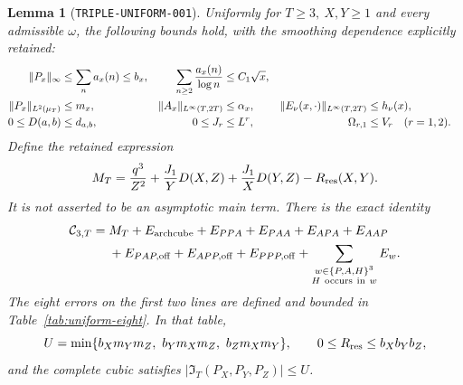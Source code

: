 \documentclass[11pt]{article}
\newtheorem{lemma}{Lemma}
\newcommand{\CT}{\mathcal C_{3,T}}
\newcommand{\IT}{\mathfrak I_T}
\begin{document}
\begin{lemma}[\texttt{TRIPLE-UNIFORM-001}]\label{lem:triple-uniform}
Uniformly for \(T\geq3,\ X,Y\geq1\) and every admissible \(\omega\), the
following bounds hold, with the smoothing dependence explicitly retained:
\begin{align}
 \|P_x\|_\infty&\leq\sum_na_x(n)\leq b_x,&
 \sum_{n\geq2}\frac{a_x(n)}{\log n}&\leq C_1\sqrt{x},\notag\\
 \|P_x\|_{L^2(\mu_T)}&\leq m_x,&
 \|A_x\|_{L^\infty(T,2T)}&\leq\alpha_x,&
 \|E_\nu(x,\cdot)\|_{L^\infty(T,2T)}&\leq h_\nu(x),\notag\\
 0\leq D(a,b)&\leq d_{a,b},&
 0\leq J_r&\leq L^r,&
 \Omega_{r,1}&\leq V_r\quad(r=1,2).
 \label{eq:uniform-norms}
\end{align}
Define the retained expression
\begin{equation}\label{eq:uniform-retained}
 M_T=\frac{q^3}{Z^2}+\frac{J_1}{Y}D(X,Z)+\frac{J_1}{X}D(Y,Z)
                    -R_{\rm res}(X,Y).
\end{equation}
It is not asserted to be an asymptotic main term. There is the exact identity
\begin{align}
 \CT={}&M_T+E_{\rm archcube}
   +E_{PPA}+E_{PAA}+E_{APA}+E_{AAP}\notag\\
   &+E_{PAP,{\rm off}}+E_{APP,{\rm off}}+E_{PPP,{\rm off}}
   +\sum_{\substack{w\in\{P,A,H\}^3\\H\ {\rm occurs\ in}\ w}}E_w.
   \label{eq:uniform-budget}
\end{align}
The eight errors on the first two lines are defined and bounded in
Table~\ref{tab:uniform-eight}. In that table,
\begin{equation}\label{eq:uniform-U}
 U=\min\{b_Xm_Ym_Z,\ b_Ym_Xm_Z,\ b_Zm_Xm_Y\},\qquad
 0\leq R_{\rm res}\leq b_Xb_Yb_Z,
\end{equation}
and the complete cubic satisfies \(|\IT(P_X,P_Y,P_Z)|\leq U\).


\end{lemma}
\end{document}
